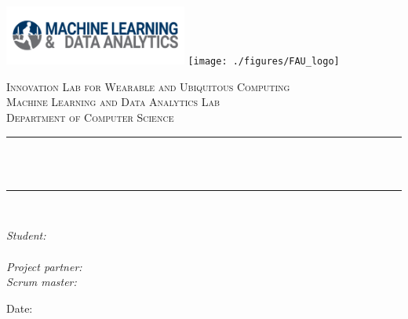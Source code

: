 \begin{titlepage}

\newcommand{\HRule}{\rule{\linewidth}{0.5mm}} %



\includegraphics[width = 6cm]{./figures/cropped-logo_mad-1024x182.png} 
\hspace{3cm}
\texttt{[image: ./figures/FAU\_logo]}\\[0.5cm] 

\begin{center} %

\textsc{\LARGE Innovation Lab for Wearable and Ubiquitous Computing}\\[1 cm] 
\textsc{\Large Machine Learning and Data Analytics Lab}\\[0.5cm] 
\textsc{\large Department of Computer Science}\\[0.5cm] 

\HRule \\[0.4cm]
{ \huge \bfseries \reporttitle}\\ %
\HRule \\[1.5cm]
\end{center}

\begin{flushleft} \large
\textit{Student:}\\
\reportauthor \\%
\vspace{1cm}
\textit{Project partner:}
\projectpartner\\ %
\vspace{1cm}
\textit{Scrum master:} \\ %
\scrummaster
\end{flushleft}
\vspace{1cm}
\makeatletter
Date: \@date 

\vfill %



\makeatother


\end{titlepage}

